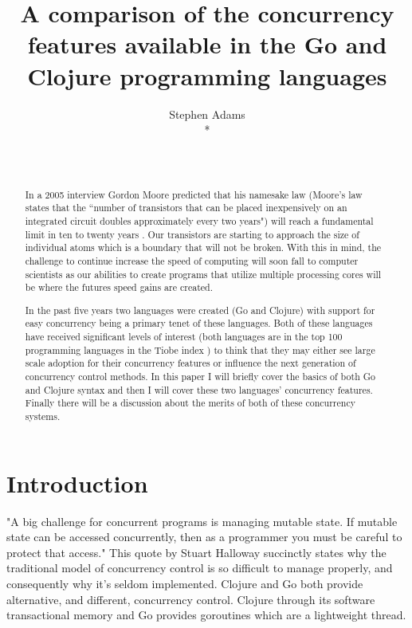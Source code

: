 \documentclass{acm_proc_article-sp}
\begin{document}
\title{A comparison of the concurrency features available in the Go and Clojure programming languages}

\author{
\alignauthor
Stephen Adams\\*
       \\
       \\
       \\
}

\maketitle
\begin{abstract}
	In a 2005 interview Gordon Moore predicted that his namesake law (Moore's law states that the ``number of transistors that can be placed inexpensively on an integrated circuit doubles approximately every two years") will reach a fundamental limit in ten to twenty years \cite{wiki:moore}. Our transistors are starting to approach the size of individual atoms which is a boundary that will not be broken. With this in mind, the challenge to continue increase the speed of computing will soon fall to computer scientists as our abilities to create programs that utilize multiple processing cores will be where the futures speed gains are created.
	
	In the past five years two languages were created (Go and Clojure)\cite{wiki:timeline} with support for easy concurrency being a primary tenet of these languages. Both of these languages have received significant levels of interest (both languages are in the top 100 programming languages in the Tiobe index \cite{tiobe}) to think that they may either see large scale adoption for their concurrency features or influence the next generation of concurrency control methods.
In this paper I will briefly cover the basics of both Go and Clojure syntax and then I will cover these two languages' concurrency features. Finally there will be a discussion about the merits of both of these concurrency systems.
\end{abstract}


\section{Introduction}
	"A big challenge for concurrent programs is managing mutable state. If mutable state can be accessed concurrently, then as a programmer you must be careful to protect that access."\cite{halloway} This quote by Stuart Halloway succinctly states why the traditional model of concurrency control is so difficult to manage properly, and consequently why it's seldom implemented. Clojure and Go both provide alternative, and different, concurrency control. Clojure through its software transactional memory\cite{wiki:clojure} and Go provides goroutines which are a lightweight thread\cite{wiki:go}. 
	
\end{document}
